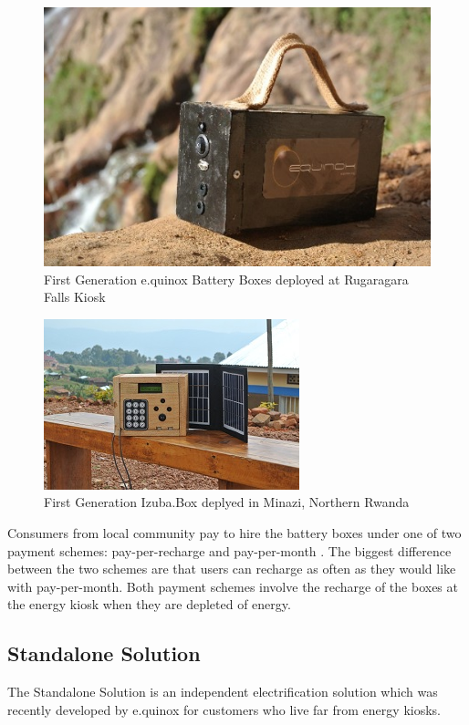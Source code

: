 \begin{figure}[h!]
\centering
\includegraphics[scale=0.7]{Images/AmaziBox.jpg}
\caption{First Generation e.quinox Battery Boxes deployed at Rugaragara Falls Kiosk}
\label{fig:AmaziBox}
\end{figure}

\begin{figure}[h!]
\centering
\includegraphics[scale=3]{Images/standalone_box.jpg}
\caption{First Generation Izuba.Box deplyed in Minazi, Northern Rwanda}
\label{fig:IzubaBox}
\end{figure}

Consumers from local community pay to hire the battery boxes under one of two payment schemes: pay-per-recharge and pay-per-month \cite{e.quinox-Hydro-web:2012}. The biggest difference between the two schemes are that users can recharge as often as they would like with pay-per-month. Both payment schemes involve the recharge of the boxes at the energy kiosk when they are depleted of energy.

\subsection*{Standalone Solution}
The Standalone Solution is an independent electrification solution which was recently developed by e.quinox for customers who live far from energy kiosks.

